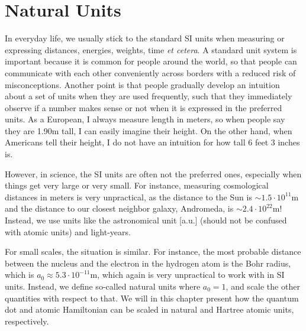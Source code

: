 \chapter{Natural Units} \label{app:units}
In everyday life, we usually stick to the standard SI units when measuring or expressing distances, energies, weights, time \textit{et cetera}. A standard unit system is important because it is common for people around the world, so that people can communicate with each other conveniently across borders with a reduced risk of misconceptions. Another point is that people gradually develop an intuition about a set of units when they are used frequently, such that they immediately observe if a number makes sense or not when it is expressed in the preferred units. As a European, I always measure length in meters, so when people say they are 1.90m tall, I can easily imagine their height. On the other hand, when Americans tell their height, I do not have an intuition for how tall 6 feet 3 inches is. 

However, in science, the SI units are often not the preferred ones, especially when things get very large or very small. For instance, measuring cosmological distances in meters is very unpractical, as the distance to the Sun is $\sim1.5\cdot10^{11}$m and the distance to our closest neighbor galaxy, Andromeda, is $\sim 2.4\cdot10^{22}$m! Instead, we use units like the astronomical unit [a.u.] (should not be confused with atomic units) and light-years. 

For small scales, the situation is similar. For instance, the most probable distance between the nucleus and the electron in the hydrogen atom is the Bohr radius, which is $a_0\approx5.3\cdot10^{-11}$m, which again is very unpractical to work with in SI units. Instead, we define so-called natural units where $a_0=1$, and scale the other quantities with respect to that. We will in this chapter present how the quantum dot and atomic Hamiltonian can be scaled in natural and Hartree atomic units, respectively.

